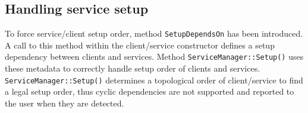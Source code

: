 \subsection{Handling service setup}

To force service/client setup order, method \texttt{SetupDependsOn} has been introduced. A call to this method within the client/service constructor defines a setup dependency between clients and services. Method \texttt{ServiceManager::Setup()} uses these metadata to correctly handle setup order of clients and services. \texttt{ServiceManager::Setup()} determines a topological order of client/service to find a legal setup order, thus cyclic dependencies are not supported and reported to the user when they are detected.

%     


%     
